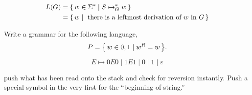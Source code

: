 \begin{definition}
    \begin{align*}
    L(G) &= { \left\{\, w \in \Sigma^* \mid S \mapsto_G^* w \,\right\} }   \\
         &= { \left\{\, w \mid \text{ there is a leftmost derivation of $w$ in $G$} \,\right\} }
    \end{align*}
\end{definition}

\begin{example}[Palindromes]
    Write a grammar for the following language,
    \[
        P = { \left\{\, w \in {0,1} \mid w^R = w \,\right\} }.
    \]

    \[
        E \mapsto 0E0 \mid 1E1 \mid 0 \mid 1 \mid \varepsilon
    \]
\end{example}

push what has been read onto the stack and check for reversion instantly.
Push a special symbol in the very first for the ``beginning of string.''

